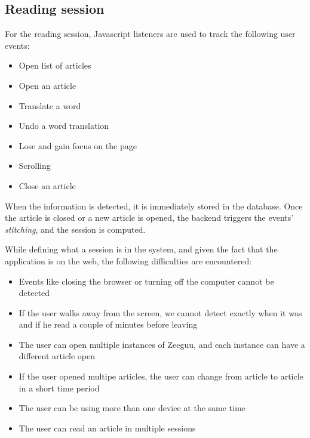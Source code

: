 \subsection{Reading session}
For the reading session, Javascript listeners are used to track the following user events:
\begin{itemize}
	\item Open list of articles
	\item Open an article
	\item Translate a word
	\item Undo a word translation
	\item Lose and gain focus on the page
	\item Scrolling
	\item Close an article
\end{itemize}

When the information is detected, it is immediately stored in the database. Once the article is closed or a new article is opened, the backend triggers the events' \textit{stitching}, and the session is computed.

While defining what a session is in the system, and given the fact that the application is on the web, the following difficulties are encountered:
\begin{itemize}
	\item Events like closing the browser or turning off the computer cannot be detected
	\item If the user walks away from the screen, we cannot detect exactly when it was and if he read a couple of minutes before leaving
	\item The user can open multiple instances of Zeeguu, and each instance can have a different article open
	\item If the user opened multipe articles, the user can change from article to article in a short time period
	\item The user can be using more than one device at the same time
	\item The user can read an article in multiple sessions
\end{itemize}

